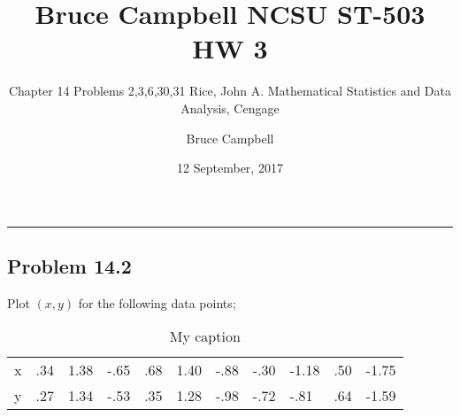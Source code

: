 \documentclass[12pt,]{article}
\title{Bruce Campbell NCSU ST-503 HW 3}
\subtitle{Chapter 14 Problems 2,3,6,30,31 Rice, John A. Mathematical Statistics
and Data Analysis, Cengage}
\author{Bruce Campbell}
\date{12 September, 2017}
\begin{document}
\maketitle

\begin{center}\rule{0.5\linewidth}{\linethickness}\end{center}

\subsection{Problem 14.2}\label{problem-14.2}

Plot \((x,y)\) for the following data points;

\begin{table}[]
\centering
\caption{My caption}
\label{my-label}
\begin{tabular}{lllllllllll}
x & .34 & 1.38 & -.65 & .68 & 1.40 & -.88 & -.30 & -1.18 & .50 & -1.75 \\
y & .27 & 1.34 & -.53 & .35 & 1.28 & -.98 & -.72 & -.81  & .64 & -1.59
\end{tabular}
\end{table}
\end{document}

